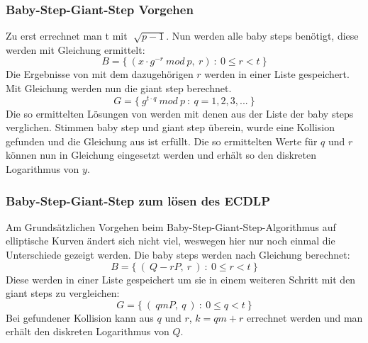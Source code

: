 		\subsubsection{Baby-Step-Giant-Step Vorgehen}
			Zu erst errechnet man t mit $\sqrt[]{p-1}$. Nun werden alle baby steps benötigt, diese werden mit Gleichung  ermittelt:
			\begin{equation}
				B = \{~(x \cdot g^{-r}~mod~p,~r)~:~0 \leq r < t~\}
			\label{Gleichung Baby steps}
			\end{equation}
			Die Ergebnisse von  mit dem dazugehörigen $r$ werden in einer Liste gespeichert. Mit Gleichung  werden nun die giant step berechnet.
			\begin{equation}
				G = \{~g^{t \cdot q}~mod~p~:~q = 1,2,3,...~\}
			\label{Gleichung Giant steps}
			\end{equation}
			Die so ermittelten Lösungen von  werden mit denen aus der Liste der baby steps verglichen. Stimmen baby step und giant step überein, wurde eine Kollision gefunden und die Gleichung aus  ist erfüllt. Die so ermittelten Werte für $q$ und $r$ können nun in Gleichung  eingesetzt werden und erhält so den diskreten Logarithmus von $y$.
		\subsubsection{Baby-Step-Giant-Step zum lösen des ECDLP}
			Am Grundsätzlichen Vorgehen beim Baby-Step-Giant-Step-Algorithmus auf elliptische Kurven ändert sich nicht viel, weswegen hier nur noch einmal die Unterschiede gezeigt werden. Die baby steps werden nach Gleichung  berechnet:
			\begin{equation}
				B = \{~(~Q- rP,~r~)~:~0 \leq r < t~\}
				\label{Gleichung Baby steps für elliptische Kurven}
			\end{equation}
			Diese werden in einer Liste gespeichert um sie in einem weiteren Schritt mit den giant steps zu vergleichen:
			\begin{equation}
				G = \{~(~qmP,~q~)~:~0 \leq q < t~\}
				\label{Gleichung Giant steps für elliptische Kurven}
			\end{equation}
			Bei gefundener Kollision kann aus $q$ und $r$, $k = qm + r$ errechnet werden und man erhält den diskreten Logarithmus von $Q$.
